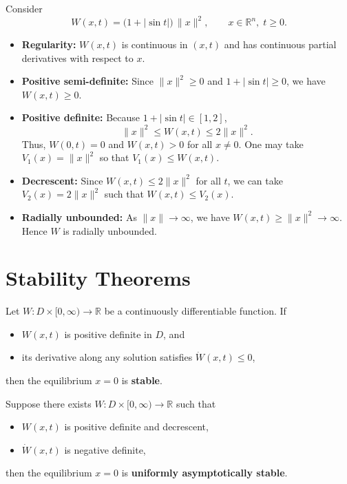 \begin{example}
Consider
\[
W(x,t) = \big(1+|\sin t|\big)\,\|x\|^2, 
\qquad x\in\mathbb{R}^n,\; t\ge 0.
\]

\begin{itemize}
    \item \textbf{Regularity:}  
    $W(x,t)$ is continuous in $(x,t)$ and has continuous partial derivatives with respect to $x$.  

    \item \textbf{Positive semi-definite:}  
    Since $\|x\|^2 \ge 0$ and $1+|\sin t|\ge 0$, we have $W(x,t)\ge 0$.  

    \item \textbf{Positive definite:}  
    Because $1+|\sin t|\in [1,2]$,  
    \[
    \|x\|^2 \le W(x,t) \le 2\|x\|^2.
    \]  
    Thus, $W(0,t)=0$ and $W(x,t)>0$ for all $x\neq 0$. One may take $V_1(x)=\|x\|^2$ so that $V_1(x)\le W(x,t)$.

    \item \textbf{Decrescent:}  
    Since $W(x,t)\le 2\|x\|^2$ for all $t$, we can take $V_2(x)=2\|x\|^2$ such that $W(x,t)\le V_2(x)$.  

    \item \textbf{Radially unbounded:}  
    As $\|x\|\to\infty$, we have $W(x,t)\ge \|x\|^2 \to\infty$. Hence $W$ is radially unbounded.  
\end{itemize}

\end{example}

\section{Stability Theorems}

\begin{theorem}
Let $W:D\times[0,\infty)\to\mathbb{R}$ be a continuously differentiable function.  
If 
\begin{itemize}
    \item $W(x,t)$ is positive definite in $D$, and  
    \item its derivative along any solution satisfies $\dot{W}(x,t)\le 0$,  
\end{itemize}
then the equilibrium $x=0$ is \textbf{stable}.
\end{theorem}

\begin{theorem}
Suppose there exists $W:D\times[0,\infty)\to\mathbb{R}$ such that
\begin{itemize}
    \item $W(x,t)$ is positive definite and decrescent,  
    \item $\dot{W}(x,t)$ is negative definite,  
\end{itemize}
then the equilibrium $x=0$ is \textbf{uniformly asymptotically stable}.
\end{theorem}

